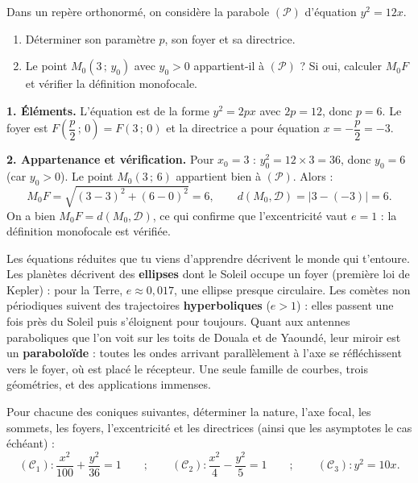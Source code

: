 \documentclass[11pt]{article}
\begin{document}
\begin{exoresolu}
Dans un repère orthonormé, on considère la parabole $(\mathcal{P})$ d'équation $y^2 = 12x$.
\begin{enumerate}
\item Déterminer son paramètre $p$, son foyer et sa directrice.
\item Le point $M_0(3\,;\,y_0)$ avec $y_0 > 0$ appartient-il à $(\mathcal{P})$ ? Si oui, calculer $M_0F$ et vérifier la définition monofocale.
\end{enumerate}
\tcblower
\textbf{1. Éléments.} L'équation est de la forme $y^2 = 2px$ avec $2p = 12$, donc $p = 6$. Le foyer est $F\left(\dfrac{p}{2}\,;\,0\right) = F(3\,;\,0)$ et la directrice a pour équation $x = -\dfrac{p}{2} = -3$.

\textbf{2. Appartenance et vérification.} Pour $x_0 = 3$ : $y_0^2 = 12 \times 3 = 36$, donc $y_0 = 6$ (car $y_0 > 0$). Le point $M_0(3\,;\,6)$ appartient bien à $(\mathcal{P})$. Alors :
\[ M_0F = \sqrt{(3-3)^2 + (6-0)^2} = 6, \qquad d(M_0, \mathcal{D}) = |3 - (-3)| = 6. \]
On a bien $M_0F = d(M_0, \mathcal{D})$, ce qui confirme que l'excentricité vaut $e = 1$ : la définition monofocale est vérifiée.
\end{exoresolu}

\begin{savaistu}
Les équations réduites que tu viens d'apprendre décrivent le monde qui t'entoure. Les planètes décrivent des \textbf{ellipses} dont le Soleil occupe un foyer (première loi de Kepler) : pour la Terre, $e \approx 0{,}017$, une ellipse presque circulaire. Les comètes non périodiques suivent des trajectoires \textbf{hyperboliques} ($e > 1$) : elles passent une fois près du Soleil puis s'éloignent pour toujours. Quant aux antennes paraboliques que l'on voit sur les toits de Douala et de Yaoundé, leur miroir est un \textbf{paraboloïde} : toutes les ondes arrivant parallèlement à l'axe se réfléchissent vers le foyer, où est placé le récepteur. Une seule famille de courbes, trois géométries, et des applications immenses.
\end{savaistu}

\begin{exercice}
Pour chacune des coniques suivantes, déterminer la nature, l'axe focal, les sommets, les foyers, l'excentricité et les directrices (ainsi que les asymptotes le cas échéant) :
\[ (\mathcal{C}_1) : \frac{x^2}{100} + \frac{y^2}{36} = 1 \qquad ; \qquad
(\mathcal{C}_2) : \frac{x^2}{4} - \frac{y^2}{5} = 1 \qquad ; \qquad
(\mathcal{C}_3) : y^2 = 10x. \]
\end{exercice}
\end{document}
